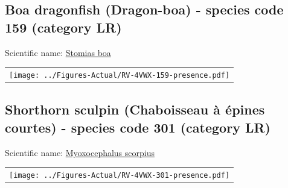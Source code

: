 \documentclass[12pt]{article}\usepackage[]{graphicx}\usepackage[]{color}
\begin{document}
\setcounter{figure}{0}

\hypertarget{sec:159}{%
\subsection{Boa dragonfish (Dragon-boa) - species code 159 (category LR)}\label{sec:159}}

  


Scientific name: \href{http://www.marinespecies.org/aphia.php?p=taxdetails\&id=127374}{Stomias boa} \newline
\begin{minipage}{1.0\textwidth}
 \begin{tabular}{c}
\texttt{[image: ../Figures-Actual/RV-4VWX-159-presence.pdf]} \\ 
\end{tabular} 
\end{minipage}
\clearpage

\renewcommand\thefigure{\thesubsection\Alph{figure}}

\setcounter{figure}{0}

\hypertarget{sec:301}{%
\subsection{Shorthorn sculpin (Chaboisseau à épines courtes) - species code 301 (category LR)}\label{sec:301}}

  


Scientific name: \href{http://www.marinespecies.org/aphia.php?p=taxdetails\&id=127203}{Myoxocephalus scorpius} \newline
\begin{minipage}{1.0\textwidth}
 \begin{tabular}{c}
\texttt{[image: ../Figures-Actual/RV-4VWX-301-presence.pdf]} \\ 
\end{tabular} 
\end{minipage}
\clearpage

\renewcommand\thefigure{\thesubsection\Alph{figure}}

\setcounter{figure}{0}
\end{document}
